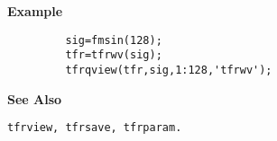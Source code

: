 {\bf \large \sf Example}
\begin{verbatim}
         sig=fmsin(128); 
         tfr=tfrwv(sig);
         tfrqview(tfr,sig,1:128,'tfrwv');
\end{verbatim}
\vspace*{.5cm}


{\bf \large \sf See Also}\\
\hspace*{1.5cm}
\begin{minipage}[t]{13.5cm}
\begin{verbatim}
tfrview, tfrsave, tfrparam.
\end{verbatim}
\end{minipage}
